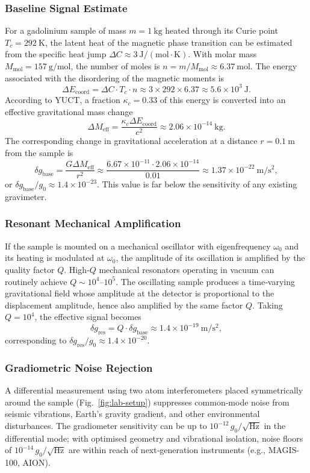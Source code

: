 \documentclass[12pt]{article}
\theoremstyle{remark}
\begin{document}
	\subsubsection{Baseline Signal Estimate}
	For a gadolinium sample of mass \(m = 1\ \mathrm{kg}\) heated through its Curie point \(T_c = 292\ \mathrm{K}\), the latent heat of the magnetic phase transition can be estimated from the specific heat jump \(\Delta C \approx 3\ \mathrm{J/(mol\cdot K)}\). With molar mass \(M_{\mathrm{mol}} = 157\ \mathrm{g/mol}\), the number of moles is \(n = m / M_{\mathrm{mol}} \approx 6.37\ \mathrm{mol}\). The energy associated with the disordering of the magnetic moments is
	\[
	\Delta E_{\mathrm{coord}} = \Delta C \cdot T_c \cdot n \approx 3 \times 292 \times 6.37 \approx 5.6\times10^{3}\ \mathrm{J}.
	\]
	According to YUCT, a fraction \(\kappa_c = 0.33\) of this energy is converted into an effective gravitational mass change
	\[
	\Delta M_{\mathrm{eff}} = \frac{\kappa_c \Delta E_{\mathrm{coord}}}{c^2} \approx 2.06\times10^{-14}\ \mathrm{kg}.
	\]
	The corresponding change in gravitational acceleration at a distance \(r = 0.1\ \mathrm{m}\) from the sample is
	\[
	\delta g_{\mathrm{base}} = \frac{G \Delta M_{\mathrm{eff}}}{r^2} \approx \frac{6.67\times10^{-11} \cdot 2.06\times10^{-14}}{0.01} \approx 1.37\times10^{-22}\ \mathrm{m/s^2},
	\]
	or \(\delta g_{\mathrm{base}}/g_0 \approx 1.4\times10^{-23}\). This value is far below the sensitivity of any existing gravimeter.
	
	\subsubsection{Resonant Mechanical Amplification}
	If the sample is mounted on a mechanical oscillator with eigenfrequency \(\omega_0\) and its heating is modulated at \(\omega_0\), the amplitude of its oscillation is amplified by the quality factor \(Q\). High‑\(Q\) mechanical resonators operating in vacuum can routinely achieve \(Q \sim 10^4\)–\(10^5\). The oscillating sample produces a time‑varying gravitational field whose amplitude at the detector is proportional to the displacement amplitude, hence also amplified by the same factor \(Q\). Taking \(Q = 10^4\), the effective signal becomes
	\[
	\delta g_{\mathrm{res}} = Q \cdot \delta g_{\mathrm{base}} \approx 1.4\times10^{-19}\ \mathrm{m/s^2},
	\]
	corresponding to \(\delta g_{\mathrm{res}}/g_0 \approx 1.4\times10^{-20}\).
	
	\subsubsection{Gradiometric Noise Rejection}
	A differential measurement using two atom interferometers placed symmetrically around the sample (Fig.~\ref{fig:lab-setup}) suppresses common‑mode noise from seismic vibrations, Earth’s gravity gradient, and other environmental disturbances. The gradiometer sensitivity can be up to \(10^{-12}\,g_0/\sqrt{\mathrm{Hz}}\) in the differential mode; with optimised geometry and vibrational isolation, noise floors of \(10^{-14}\,g_0/\sqrt{\mathrm{Hz}}\) are within reach of next‑generation instruments (e.g., MAGIS-100, AION).
	
\end{document}
